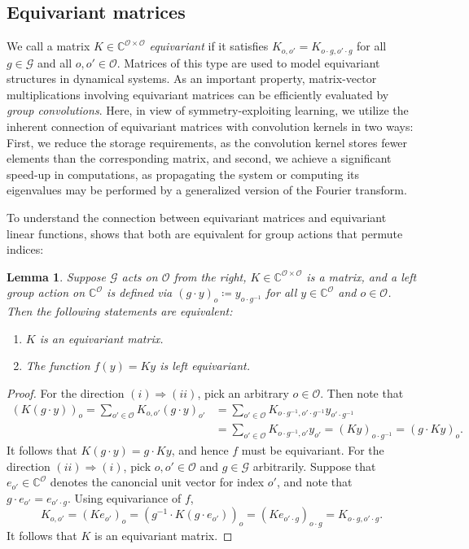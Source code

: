 \documentclass[preprint,12pt,authoryear]{elsarticle}
\newcommand{\C}{\mathbb{C}}
\newcommand\Gc{\mathcal G}
\newcommand\Oc{\mathcal O}
\newtheorem{lemma}{Lemma}%
\begin{document}
{\subsection{Equivariant matrices}\label{sec:equivariant-matrices}

We call a matrix $K \in \C^{\Oc \times \Oc}$ \emph{equivariant} if it satisfies $K_{o, o'} = K_{o \cdot g, o' \cdot g}$ for all $g \in \Gc$ and all $o,o'\in \Oc$. %
Matrices of this type are used to model equivariant structures in dynamical systems.
As an important property, matrix-vector multiplications involving %
equivariant matrices can be efficiently evaluated %
by \emph{group convolutions}. Here, in view of symmetry-exploiting learning, we utilize the inherent connection of equivariant matrices with convolution kernels in two ways: First, we reduce the storage requirements, as the convolution kernel stores fewer elements than the corresponding matrix, and second, we achieve a significant speed-up in computations, as %
propagating the system or computing its eigenvalues may be performed by a
generalized version of the Fourier transform. %

To understand the connection between equivariant matrices and equivariant linear functions,  shows that both are equivalent for group actions that permute indices:

\begin{lemma}
    \label{thr:equivariant-matrices}
    Suppose $\Gc$ acts on $\Oc$ from the right, $K \in \C^{\Oc \times \Oc}$ is a matrix, and a left group action on $\C^\Oc$ is defined via $(g \cdot y)_o \coloneqq y_{o \cdot g^{-1}}$ for all $y \in \C^\Oc$ and $o \in \Oc$. Then the following statements are equivalent:  %
    \begin{enumerate}[noitemsep]
        \item[(i)] $K$ is an equivariant matrix.
        \item[(ii)] The function $f(y) = K y$ is left equivariant.
    \end{enumerate}
\end{lemma}
\begin{proof}
    For the direction $(i) \Rightarrow (ii)$,  pick an arbitrary $o \in \Oc$. Then note that
    \begin{align*}
        ( K (g\cdot y) )_o
        = \sum_{o' \in \Oc} K_{o,o'} (g \cdot y)_{o'}
        &= \sum_{o' \in \Oc} K_{o \cdot g^{-1}, o' \cdot g^{-1}} y_{o' \cdot g^{-1}} \\
        &= \sum_{o' \in \Oc} K_{o \cdot g^{-1}, o'} y_{o'}
        = ( K y)_{o \cdot g^{-1}} = (g \cdot K y)_o.
    \end{align*} 
    It follows that $K (g \cdot y) = g \cdot K y$, and hence $f$ must be equivariant. For the direction $(ii) \Rightarrow (i)$, pick $o,o' \in \Oc$ and $g \in \Gc$ arbitrarily. Suppose that $e_{o'} \in \C^\Oc$ denotes the canoncial unit vector for index $o'$, and note that $g \cdot e_{o'} = e_{o' \cdot g}$. Using equivariance of $f$,
    $$
        K_{o,o'}  
        = (K e_{o'})_o 
        = (g^{-1} \cdot K (g \cdot e_{o'}))_{o}
        = (K e_{o' \cdot g})_{o \cdot g}
        = K_{o\cdot g, o' \cdot g}.
    $$
    It follows that $K$ is an equivariant matrix.
\end{proof}

}
\end{document}
